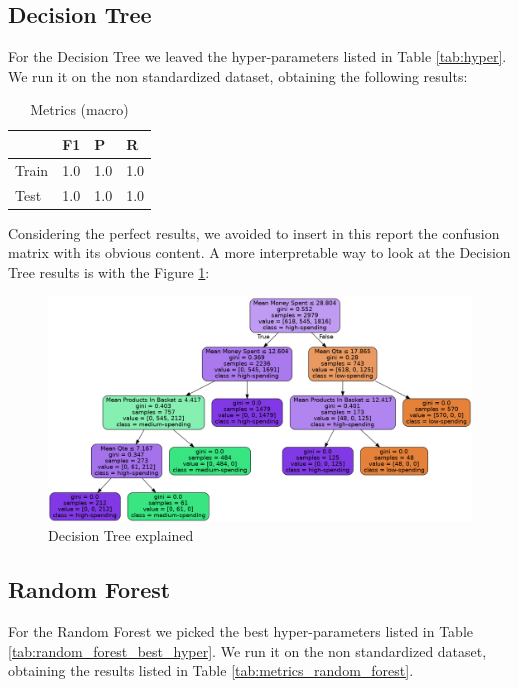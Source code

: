 \documentclass[12pt]{article}
\begin{document}
\newpage
\subsection{Decision Tree}
For the Decision Tree we leaved the hyper-parameters listed in Table \ref{tab:hyper}. We run it on the non standardized dataset, obtaining the following results:

\begin{table}[h]
    \centering
    \begin{tabular}{@{}lccc@{}}
    \toprule
     & \multicolumn{1}{l}{F1} & \multicolumn{1}{l}{P} & \multicolumn{1}{l}{R } \\ \midrule
    Train & 1.0 & 1.0 & 1.0 \\
    Test & 1.0 & 1.0 & 1.0 \\ \bottomrule
    \end{tabular}
    \caption{Metrics (macro)}
    \label{tab:metrics_decision_tree}
\end{table}
Considering the perfect results, we avoided to insert in this report the confusion matrix with its obvious content.
A more interpretable way to look at the Decision Tree results is with the Figure \ref{fig:decision_tree_explained}:
\begin{figure}[h]
    \centering
    \includegraphics[scale=0.35]{images/figure_decision_tree.png}
    \caption{Decision Tree explained}
    \label{fig:decision_tree_explained}
\end{figure}

\newpage
\subsection{Random Forest}
For the Random Forest we picked the best hyper-parameters listed in Table \ref{tab:random_forest_best_hyper}. We run it on the non standardized dataset, obtaining the results listed in Table \ref{tab:metrics_random_forest}.
\end{document}
